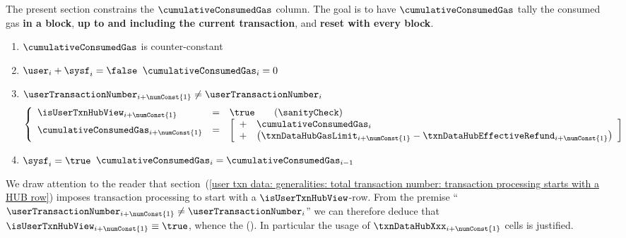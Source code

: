 \def\locFirstRowOfNewTransactionRoff {\numConst{1}}
The present section constrains the $\cumulativeConsumedGas$ column.
The goal is to have $\cumulativeConsumedGas$
tally the consumed gas \textbf{in a block},
\textbf{up to and including the current transaction},
and \textbf{reset with every block}.
\begin{enumerate}
	\item $\cumulativeConsumedGas$ is counter-constant
	\item
		\label{user txn data: generalities: cumulative gas: cumulative gas is zero outside of user and sysf transactions}
		\If $\user _{i} + \sysf _{i} = \false$ \Then $\cumulativeConsumedGas _{i} = 0$
	\item
		\label{user txn data: generalities: cumulative gas: cumulative gas update constraints}
		\If $\userTransactionNumber _{i + \locFirstRowOfNewTransactionRoff} \neq \userTransactionNumber _{i}$ \Then
		\[
			\left\{ \begin{array}{lcl}
				\isUserTxnHubView      _{i + \locFirstRowOfNewTransactionRoff} & = & \true \qquad (\sanityCheck) \\
				\cumulativeConsumedGas _{i + \locFirstRowOfNewTransactionRoff} & = &
				\left[ \begin{array}{ll}
					+ & \cumulativeConsumedGas    _{i}                                                 \\
					+ & \big( \txnDataHubGasLimit _{i + \locFirstRowOfNewTransactionRoff} - \txnDataHubEffectiveRefund _{i + \locFirstRowOfNewTransactionRoff} \big) \\
				\end{array}\right] \\
			\end{array} \right.
		\]
	\item
		\label{user txn data: generalities: cumulative gas: cumulative gas propagation constraints during SYSF}
		\If $\sysf _{i} = \true$ \Then $\cumulativeConsumedGas _{i} = \cumulativeConsumedGas _{i - 1}$
\end{enumerate}
\saNote{}
We draw attention to the reader that
section~(\ref{user txn data: generalities: total transaction number: transaction processing starts with a HUB row})
imposes transaction processing to start with a $\isUserTxnHubView$-row.
From the premise ``$\userTransactionNumber _{i + \locFirstRowOfNewTransactionRoff} \neq \userTransactionNumber _{i}$''
we can therefore deduce that $\isUserTxnHubView _{i + \locFirstRowOfNewTransactionRoff} \equiv \true$,
whence the (\sanityCheck).
In particular the usage of $\txnDataHubXxx _{i + \locFirstRowOfNewTransactionRoff}$ cells is justified.

